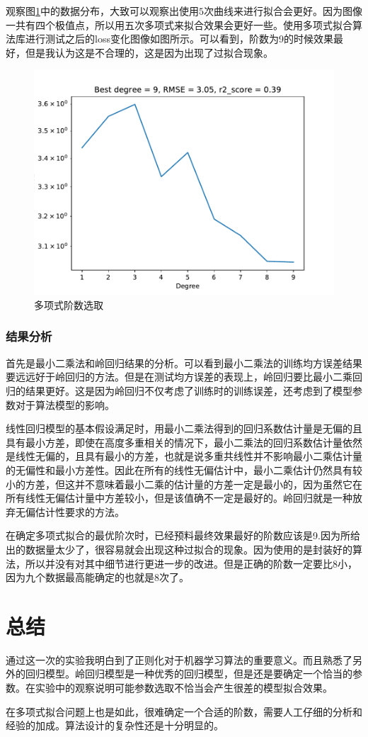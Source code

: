 \documentclass[final]{cvpr}
\begin{document}
观察图\ref{poly}中的数据分布，大致可以观察出使用$5$次曲线来进行拟合会更好。因为图像一共有四个极值点，所以用五次多项式来拟合效果会更好一些。使用多项式拟合算法库进行测试之后的loss变化图像如图所示。可以看到，阶数为9的时候效果最好，但是我认为这是不合理的，这是因为出现了过拟合现象。
\begin{figure}[]
    \centering
    \includegraphics{figures/poly.pdf}
\caption{多项式阶数选取}
\label{poly}               
\end{figure}
\subsubsection{结果分析}
首先是最小二乘法和岭回归结果的分析。可以看到最小二乘法的训练均方误差结果要远远好于岭回归的方法。但是在测试均方误差的表现上，岭回归要比最小二乘回归的结果更好。这是因为岭回归不仅考虑了训练时的训练误差，还考虑到了模型参数对于算法模型的影响。\par
线性回归模型的基本假设满足时，用最小二乘法得到的回归系数估计量是无偏的且具有最小方差，即使在高度多重相关的情况下，最小二乘法的回归系数估计量依然是线性无偏的，且具有最小的方差，也就是说多重共线性并不影响最小二乘估计量的无偏性和最小方差性。因此在所有的线性无偏估计中，最小二乘估计仍然具有较小的方差，但这并不意味着最小二乘的估计量的方差一定是最小的，因为虽然它在所有线性无偏估计量中方差较小，但是该值确不一定是最好的。岭回归就是一种放弃无偏估计性要求的方法。\par
在确定多项式拟合的最优阶次时，已经预料最终效果最好的阶数应该是9.因为所给出的数据量太少了，很容易就会出现这种过拟合的现象。因为使用的是封装好的算法，所以并没有对其中细节进行更进一步的改进。但是正确的阶数一定要比8小，因为九个数据最高能确定的也就是8次了。
\section{总结}\label{sec:Conclusion}
通过这一次的实验我明白到了正则化对于机器学习算法的重要意义。而且熟悉了另外的回归模型。岭回归模型是一种优秀的回归模型，但是还是要确定一个恰当的参数。在实验中的观察说明可能参数选取不恰当会产生很差的模型拟合效果。\par
在多项式拟合问题上也是如此，很难确定一个合适的阶数，需要人工仔细的分析和经验的加成。算法设计的复杂性还是十分明显的。




\end{document}
